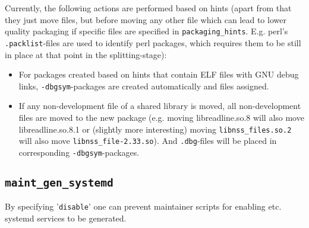\documentclass[a4paper]{scrartcl}
\newcommand{\file}[1]{\texttt{#1}}
\begin{document}
	Currently, the following actions are performed based on hints (apart from that they just move files, but before moving any other file which can lead to lower quality packaging if specific files are specified in \texttt{packaging\_hints}. E.g. perl's \file{.packlist}-files are used to identify perl packages, which requires them to be still in place at that point in the splitting-stage):
	
	\begin{itemize}
		\item For packages created based on hints that contain ELF files with GNU debug links, \texttt{-dbgsym}-packages are created automatically and files assigned.
		
		\item If any non-development file of a shared library is moved, all non-development files are moved to the new package (e.g. moving libreadline.so.8 will also move libreadline.so.8.1 or (slightly more interesting) moving \file{libnss\_files.so.2} will also move \file{libnss\_file-2.33.so}). And \file{.dbg}-files will be placed in corresponding \texttt{-dbgsym}-packages.
	\end{itemize}

	\subsection{\texttt{maint\_gen\_systemd}}
	\label{sec:maint_gen_systemd}
	
	By specifying '\texttt{disable}' one can prevent maintainer scripts for enabling etc. systemd services to be generated.
	
\end{document}
